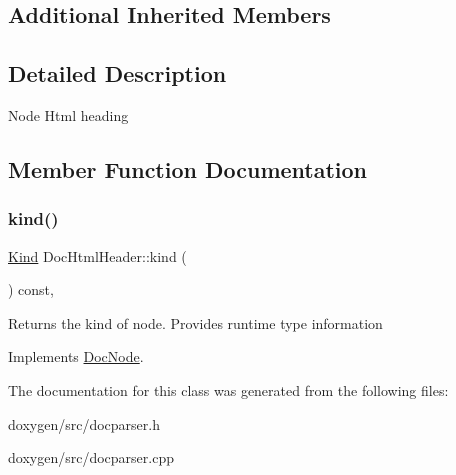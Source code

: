 \subsection*{Additional Inherited Members}


\subsection{Detailed Description}
Node Html heading 

\subsection{Member Function Documentation}
\mbox{\label{class_doc_html_header_adffa74b5ca39ae94f0a7c1d13cf57f25}} 
\subsubsection{\texorpdfstring{kind()}{kind()}}
{\footnotesize\ttfamily \mbox{\hyperlink{class_doc_node_aebd16e89ca590d84cbd40543ea5faadb}{Kind}} Doc\+Html\+Header\+::kind (\begin{DoxyParamCaption}{ }\end{DoxyParamCaption}) const\hspace{0.3cm}{\ttfamily [inline]}, {\ttfamily [virtual]}}

Returns the kind of node. Provides runtime type information 

Implements \mbox{\hyperlink{class_doc_node_a108ffd214a72ba6e93dac084a8f58049}{Doc\+Node}}.



The documentation for this class was generated from the following files\+:\begin{DoxyCompactItemize}
\item 
doxygen/src/docparser.\+h\item 
doxygen/src/docparser.\+cpp\end{DoxyCompactItemize}
